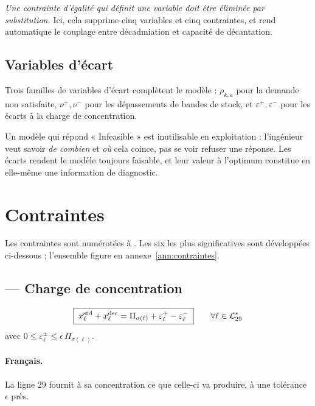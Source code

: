 \begin{encadre}[title={Règle générale de modélisation}]
\emph{Une contrainte d'égalité qui définit une variable doit être éliminée par
substitution.} Ici, cela supprime cinq variables et cinq contraintes, et rend automatique le
couplage entre décadmiation et capacité de décantation.
\end{encadre}

\subsection{Variables d'écart}

Trois familles de variables d'écart complètent le modèle : $\rho_{k,a}$ pour la demande non
satisfaite, $\nu^{+}, \nu^{-}$ pour les dépassements de bandes de stock, et
$\varepsilon^{+}, \varepsilon^{-}$ pour les écarts à la charge de concentration.

\begin{encadre}[title={Pourquoi des variables d'écart}]
Un modèle qui répond « Infeasible » est inutilisable en exploitation : l'ingénieur veut
savoir \emph{de combien} et \emph{où} cela coince, pas se voir refuser une réponse. Les
écarts rendent le modèle toujours faisable, et leur valeur à l'optimum constitue en
elle-même une information de diagnostic.
\end{encadre}

\section{Contraintes}

Les contraintes sont numérotées  à . Les six les plus significatives sont
développées ci-dessous ; l'ensemble figure en annexe~\ref{ann:contraintes}.

\subsection{ --- Charge de concentration}

\begin{equation}
\boxed{\;x^{\mathrm{std}}_\ell + x^{\mathrm{dec}}_\ell = \Pi_{\sigma(\ell)} + \varepsilon^{+}_\ell - \varepsilon^{-}_\ell\;}
\qquad \forall \ell \in \mathcal{L}^{\ast}_{29}
\label{eq:C4}
\end{equation}
avec $0 \le \varepsilon^{\pm}_\ell \le \epsilon\, \Pi_{\sigma(\ell)}$.

\paragraph{Français.} La ligne 29 fournit à sa concentration ce que celle-ci va produire, à
une tolérance $\epsilon$ près.

